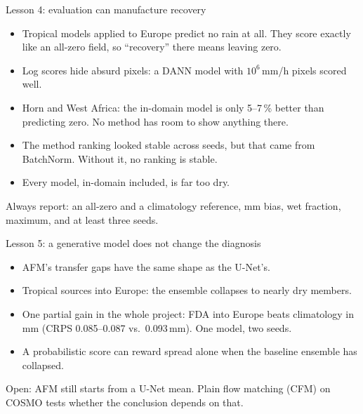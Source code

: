 \documentclass[11pt,aspectratio=169,xcolor=table]{beamer}
\newcommand{\take}[1]{\vfill\begin{block}{}#1\end{block}}
\begin{document}
\begin{frame}{Lesson 4: evaluation can manufacture recovery}
\begin{itemize}
  \item Tropical models applied to Europe predict no rain at all. They
        score exactly like an all-zero field, so ``recovery'' there means
        leaving zero.
  \item Log scores hide absurd pixels: a DANN model with
        $10^{6}$\,mm/h pixels scored well.
  \item Horn and West Africa: the in-domain model is only 5--7\,\% better
        than predicting zero. No method has room to show anything there.
  \item The method ranking looked stable across seeds, but that came from
        BatchNorm. Without it, no ranking is stable.
  \item Every model, in-domain included, is far too dry.
\end{itemize}
\take{Always report: an all-zero and a climatology reference, mm bias, wet
fraction, maximum, and at least three seeds.}
\end{frame}

\begin{frame}{Lesson 5: a generative model does not change the diagnosis}
\begin{itemize}
  \item AFM's transfer gaps have the same shape as the U-Net's.
  \item Tropical sources into Europe: the ensemble collapses to nearly dry
        members.
  \item One partial gain in the whole project: FDA into Europe beats
        climatology in mm (CRPS 0.085--0.087 vs.\ 0.093\,mm). One model, two seeds.
  \item A probabilistic score can reward spread alone when the baseline
        ensemble has collapsed.
\end{itemize}
\take{Open: AFM still starts from a U-Net mean. Plain flow matching (CFM)
on COSMO tests whether the conclusion depends on that.}
\end{frame}
\end{document}
